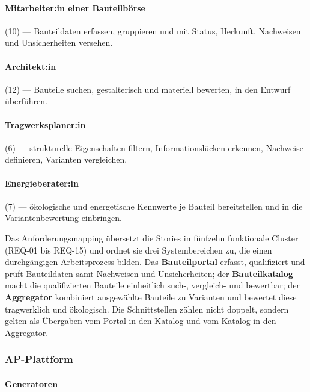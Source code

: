 \documentclass[type=zwischenbericht]{zukunftbau}
\begin{document}
\begin{SemioNest}
\paragraph{Mitarbeiter:in einer Bauteilbörse}
(10) --- Bauteildaten erfassen, gruppieren und mit Status, Herkunft, Nachweisen und Unsicherheiten versehen.

\paragraph{Architekt:in}
(12) --- Bauteile suchen, gestalterisch und materiell bewerten, in den Entwurf überführen.

\paragraph{Tragwerksplaner:in}
(6) --- strukturelle Eigenschaften filtern, Informationslücken erkennen, Nachweise definieren, Varianten vergleichen.

\paragraph{Energieberater:in}
(7) --- ökologische und energetische Kennwerte je Bauteil bereitstellen und in die Variantenbewertung einbringen.
\end{SemioNest}

Das Anforderungsmapping übersetzt die Stories in fünfzehn funktionale Cluster (REQ-01 bis REQ-15) und ordnet sie drei Systembereichen zu, die einen durchgängigen Arbeitsprozess bilden. Das \textbf{Bauteilportal} erfasst, qualifiziert und prüft Bauteildaten samt Nachweisen und Unsicherheiten; der \textbf{Bauteilkatalog} macht die qualifizierten Bauteile einheitlich such-, vergleich- und bewertbar; der \textbf{Aggregator} kombiniert ausgewählte Bauteile zu Varianten und bewertet diese tragwerklich und ökologisch. Die Schnittstellen zählen nicht doppelt, sondern gelten als Übergaben vom Portal in den Katalog und vom Katalog in den Aggregator.

\subsubsection{AP-Plattform}

\paragraph{Generatoren}
\end{document}
